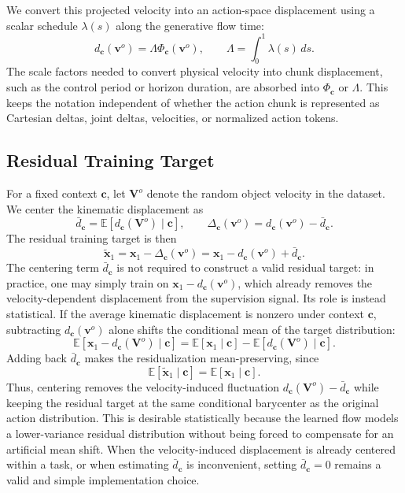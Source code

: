 \documentclass{article} %
\begin{document}
We convert this projected velocity into an action-space displacement using a
scalar schedule $\lambda(s)$ along the generative flow time:
\begin{equation}
    d_{\mathbf c}(\mathbf v^{o})
    =
    \Lambda \Phi_{\mathbf c}(\mathbf v^{o}),
    \qquad
    \Lambda=\int_0^1 \lambda(s)\,ds .
    \label{eq:integrated_velocity_displacement}
\end{equation}
The scale factors needed to convert physical velocity into chunk displacement,
such as the control period or horizon duration, are absorbed into
$\Phi_{\mathbf c}$ or $\Lambda$. This keeps the notation independent of whether
the action chunk is represented as Cartesian deltas, joint deltas, velocities,
or normalized action tokens.

\subsection{Residual Training Target}
\label{subsec:residual_target}

For a fixed context $\mathbf c$, let $\mathbf V^{o}$ denote the random object
velocity in the dataset. We center the kinematic displacement as
\[
    \bar d_{\mathbf c}
    =
    \mathbb E[d_{\mathbf c}(\mathbf V^{o})\mid\mathbf c],
    \qquad
    \Delta_{\mathbf c}(\mathbf v^{o})
    =
    d_{\mathbf c}(\mathbf v^{o})-\bar d_{\mathbf c}.
\]
The residual training target is then
\begin{equation}
    \widetilde{\mathbf x}_1
    =
    \mathbf x_1-\Delta_{\mathbf c}(\mathbf v^{o})
    =
    \mathbf x_1-d_{\mathbf c}(\mathbf v^{o})+\bar d_{\mathbf c}.
    \label{eq:residual_target}
\end{equation}
The centering term $\bar d_{\mathbf c}$ is not required to construct a valid
residual target: in practice, one may simply train on
$\mathbf x_1-d_{\mathbf c}(\mathbf v^o)$, which already removes the
velocity-dependent displacement from the supervision signal. Its role is instead
statistical. If the average kinematic displacement is nonzero under context
$\mathbf c$, subtracting $d_{\mathbf c}(\mathbf v^o)$ alone shifts the
conditional mean of the target distribution:
\[
    \mathbb E[\mathbf x_1-d_{\mathbf c}(\mathbf V^o)\mid \mathbf c]
    =
    \mathbb E[\mathbf x_1\mid \mathbf c]
    -
    \mathbb E[d_{\mathbf c}(\mathbf V^o)\mid \mathbf c].
\]
Adding back $\bar d_{\mathbf c}$ makes the residualization mean-preserving,
since
\[
    \mathbb E[\widetilde{\mathbf x}_1\mid \mathbf c]
    =
    \mathbb E[\mathbf x_1\mid \mathbf c].
\]
Thus, centering removes the velocity-induced fluctuation
$d_{\mathbf c}(\mathbf V^o)-\bar d_{\mathbf c}$ while keeping the residual
target at the same conditional barycenter as the original action distribution.
This is desirable statistically because the learned flow models a lower-variance
residual distribution without being forced to compensate for an artificial mean
shift. When the velocity-induced displacement is already centered within a task,
or when estimating $\bar d_{\mathbf c}$ is inconvenient, setting
$\bar d_{\mathbf c}=0$ remains a valid and simple implementation choice.
\end{document}
